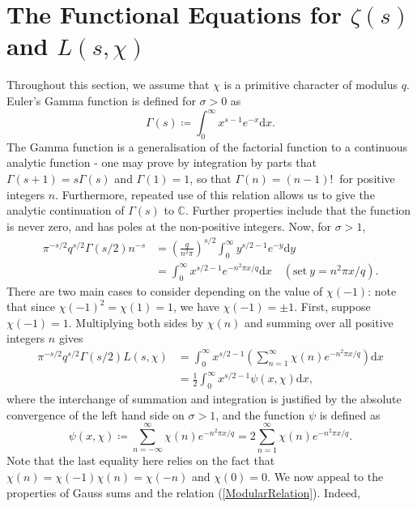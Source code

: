 \section{The Functional Equations for $\zeta(s)$ and $L(s, \chi)$}
Throughout this section, we assume that $\chi$ is a primitive character of modulus $q$. Euler's Gamma function is defined for $\sigma > 0$ as 
\begin{equation}
    \Gamma(s) \coloneqq \int_{0}^{\infty}x^{s - 1} e^{-x} \mathrm{d} x. \nonumber
\end{equation}
The Gamma function is a generalisation of the factorial function to a continuous analytic function - one may prove by integration by parts that $\Gamma(s + 1) = s\Gamma(s)$ and $\Gamma(1) = 1$, so that $\Gamma(n) = (n - 1)! \ $ for positive integers $n$. Furthermore, repeated use of this relation allows us to give the analytic continuation of $\Gamma(s)$ to $\mathbb{C}$. Further properties include that the function is never zero, and has poles at the non-positive integers. Now, for $\sigma > 1$,
\begin{align}
    \label{FirstIdentity}
    \pi^{-s/2} q^{s/2} \Gamma(s/2) n^{-s} &= \left(\frac{q}{n^2 \pi}\right)^{s/2} \int_{0}^{\infty} y^{s/2 - 1} e^{-y} \mathrm{d} y \nonumber \\
    &= \int_{0}^{\infty} x^{s/2 - 1} e^{-n^{2} \pi x / q} \mathrm{d} x \quad (\textrm{set} \ y = n^{2}\pi x /q).
\end{align}
There are two main cases to consider depending on the value of $\chi(-1)$: note that since $\chi(-1)^{2} = \chi(1) = 1$, we have $\chi(-1) = \pm 1$. First, suppose $\chi(-1) = 1$. Multiplying both sides by $\chi(n)$ and summing over all positive integers $n$ gives
\begin{align}
    \pi^{-s/2} q^{s/2} \Gamma(s/2) L(s, \chi) &= \int_{0}^{\infty} x^{s/2 - 1} \left(\sum_{n=1}^{\infty}\chi(n) e^{-n^{2} \pi x / q} \right) \mathrm{d} x \nonumber \\
    &= \frac12 \int_{0}^{\infty} x^{s/2 - 1} \psi(x, \chi) \mathrm{d} x, \nonumber
\end{align}
where the interchange of summation and integration is justified by the absolute convergence of the left hand side on $\sigma > 1$, and the function $\psi$ is defined as
\begin{equation}
    \psi(x, \chi) \coloneqq \sum_{n=-\infty}^{\infty}\chi(n) e^{-n^{2}\pi x/q} = 2\sum_{n=1}^{\infty}\chi(n) e^{-n^{2}\pi x/q}. \nonumber
\end{equation}
Note that the last equality here relies on the fact that $\chi(n) = \chi(-1)\chi(n) = \chi(-n)$ and $\chi(0) = 0$. We now appeal to the properties of Gauss sums and the relation (\ref{ModularRelation}). Indeed,

